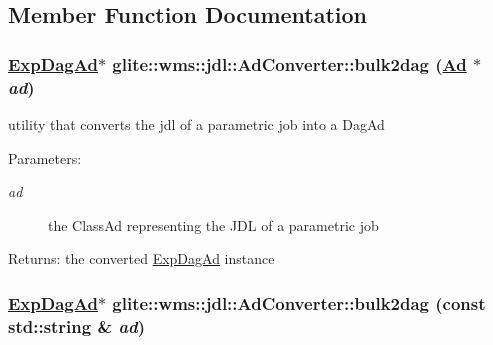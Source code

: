 \subsection{Member Function Documentation}
\hypertarget{classglite_1_1wms_1_1jdl_1_1AdConverter_z23_5}{
\subsubsection[bulk2dag]{\setlength{\rightskip}{0pt plus 5cm}\hyperlink{classglite_1_1wms_1_1jdl_1_1ExpDagAd}{Exp\-Dag\-Ad}$\ast$ glite::wms::jdl::Ad\-Converter::bulk2dag (\hyperlink{classglite_1_1wms_1_1jdl_1_1Ad}{Ad} $\ast$ {\em ad})}}
\label{classglite_1_1wms_1_1jdl_1_1AdConverter_z23_5}


utility that converts the jdl of a parametric job into a Dag\-Ad \begin{Desc}
\item[Parameters:]
\begin{description}
\item[{\em ad}]the Class\-Ad representing the JDL of a parametric job \end{description}
\end{Desc}
\begin{Desc}
\item[Returns:]the converted \hyperlink{classglite_1_1wms_1_1jdl_1_1ExpDagAd}{Exp\-Dag\-Ad} instance\end{Desc}
\hypertarget{classglite_1_1wms_1_1jdl_1_1AdConverter_z23_4}{
\subsubsection[bulk2dag]{\setlength{\rightskip}{0pt plus 5cm}\hyperlink{classglite_1_1wms_1_1jdl_1_1ExpDagAd}{Exp\-Dag\-Ad}$\ast$ glite::wms::jdl::Ad\-Converter::bulk2dag (const std::string \& {\em ad})}}
\label{classglite_1_1wms_1_1jdl_1_1AdConverter_z23_4}


